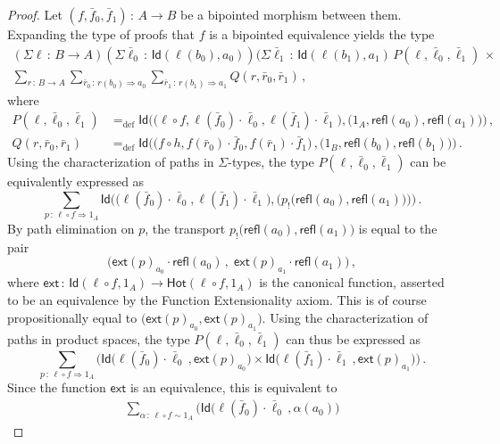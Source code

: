 \documentclass[10pt,a4paper,oneside,reqno]{amsart}
\theoremstyle{mythm}
\theoremstyle{mydef}
\theoremstyle{myrmk}
\newcommand{\defeq}{=_{\mathrm{def}}}
\newcommand{\co}{\,{:}\,}
\newcommand{\com}{\circ}
\newcommand{\ct}{\cdot}
\newcommand{\Hot}{\mathsf{Hot}}
\newcommand{\ext}{\mathsf{ext}}
\newcommand{\Id}{\mathsf{Id}}
\newcommand{\refl}{\mathsf{refl}}
\begin{document}
\begin{proof}
Let  $(f, \bar{f}_0, \bar{f}_1) \co A \to B$ be a bipointed morphism between them. Expanding the type of 
proofs that $f$ is a bipointed equivalence yields the type
\begin{multline*} 
(\Sigma \ell \co B \to  A)
(\Sigma \bar{\ell}_0 \co \Id( \ell(b_0), a_0)) 
(\Sigma  \bar{\ell}_1 \co \Id( \ell(b_1), a_1) \, 
 P(\ell,\bar{\ell}_0,\bar{\ell}_1) \, \times \\
 \textstyle
 \sum_{r \co B \to A} 
 \sum_{\bar{r}_0 \co r(b_0) \Rightarrow a_0} 
 \sum_{\bar{r}_1 \co  r(b_1) \Rightarrow a_1} 
 Q(r,\bar{r}_0,\bar{r}_1)   \, ,
\end{multline*}
where
\begin{align*}
P(\ell,\bar{\ell}_0,\bar{\ell}_1) & \defeq \Id \Big( \big( \ell \com f, \ell(\bar{f}_0) \ct \bar{\ell}_0, \ell(\bar{f}_1) \ct \bar{\ell}_1\big), \big( 1_A, \refl(a_0), \refl(a_1) \big) \Big)  \, , \\
Q(r,\bar{r}_0,\bar{r}_1) & \defeq \Id \Big( \big( f \com h,   f(\bar{r}_0) \ct \bar{f}_0, f(\bar{r}_1) \ct \bar{f}_1  \big) \, , \big( 1_B, \refl(b_0), \refl(b_1) \big) \Big) \, .
\end{align*}
Using the characterization of paths in $\Sigma$-types, the type $P(\ell,\bar{\ell}_0,\bar{\ell}_1)$ can be equivalently expressed as
\[
\sum_{p \co \ell \com f \Rightarrow 1_A}  
\Id \Big(  \big( \ell (\bar{f}_0) \ct \bar{\ell }_0, \ell (\bar{f}_1) \ct \bar{\ell }_1\big), \big( p_{!}\big(\refl(a_0), \refl(a_1) \big) \big) \Big) \, .
\]
By path elimination on $p$, the transport $p_{!}\big(\refl(a_0), \refl(a_1) \big)$ is equal to the pair 
\[
\big(  \ext(p)_{a_0} \ct \refl(a_0) \, , \;  \ext(p)_{a_1} \ct \refl(a_1) \big) \, ,
\]
where $\ext \co \Id(\ell \com f, 1_A) \to \Hot(\ell \com f,  1_A)$ is the canonical function, asserted to be an equivalence by the Function Extensionality axiom. This is of course propositionally equal to $\big(\ext(p)_{a_0}, \ext(p)_{a_1} \big)$. Using the characterization of paths in product spaces, the type $P(\ell,\bar{\ell}_0,\bar{\ell}_1)$ can thus be expressed as
\[
\sum_{ p \co \ell \com f \Rightarrow 1_A} \Big(
\Id  \big( \ell (\bar{f}_0) \ct \bar{\ell}_0 \, ,  \ext(p)_{a_0} \big) 
\times 
\Id \big( \ell(\bar{f}_1) \ct \bar{\ell}_1 \, ,  \ext(p)_{a_1} \big)
\Big) \, .
\]
Since the function $\ext$ is an equivalence, this is equivalent to
\begin{align*}
\sum_{\alpha \co \ell \com f \sim 1_A} 
\Big( \Id  \big( \ell (\bar{f}_0) \ct \bar{\ell}_0 \, ,  \alpha(a_0) \big) 

\end{align*}
\end{proof}
\end{document}

